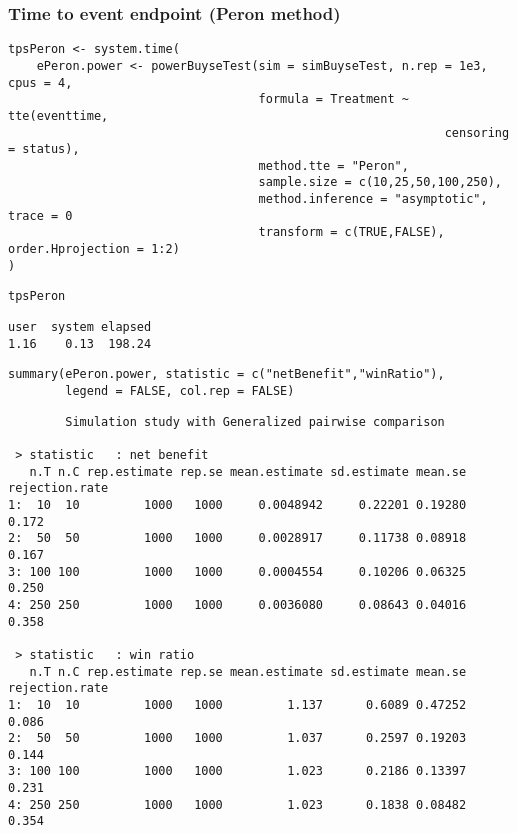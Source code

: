 \documentclass[12pt]{article}
\begin{document}
\clearpage

\subsubsection{Time to event endpoint (Peron method)}
\label{sec:org3f23fac}
\lstset{language=r,label= ,caption= ,captionpos=b,numbers=none}
\begin{lstlisting}
tpsPeron <- system.time(
	ePeron.power <- powerBuyseTest(sim = simBuyseTest, n.rep = 1e3, cpus = 4,
								   formula = Treatment ~ tte(eventtime, 
															 censoring = status), 
								   method.tte = "Peron",
								   sample.size = c(10,25,50,100,250), 
								   method.inference = "asymptotic", trace = 0
								   transform = c(TRUE,FALSE), order.Hprojection = 1:2)
)
\end{lstlisting}

\lstset{language=r,label= ,caption= ,captionpos=b,numbers=none}
\begin{lstlisting}
tpsPeron
\end{lstlisting}

\begin{verbatim}
user  system elapsed 
1.16    0.13  198.24
\end{verbatim}

\lstset{language=r,label= ,caption= ,captionpos=b,numbers=none}
\begin{lstlisting}
summary(ePeron.power, statistic = c("netBenefit","winRatio"), 
		legend = FALSE, col.rep = FALSE)
\end{lstlisting}

\begin{verbatim}
        Simulation study with Generalized pairwise comparison

 > statistic   : net benefit
   n.T n.C rep.estimate rep.se mean.estimate sd.estimate mean.se rejection.rate
1:  10  10         1000   1000     0.0048942     0.22201 0.19280          0.172
2:  50  50         1000   1000     0.0028917     0.11738 0.08918          0.167
3: 100 100         1000   1000     0.0004554     0.10206 0.06325          0.250
4: 250 250         1000   1000     0.0036080     0.08643 0.04016          0.358

 > statistic   : win ratio
   n.T n.C rep.estimate rep.se mean.estimate sd.estimate mean.se rejection.rate
1:  10  10         1000   1000         1.137      0.6089 0.47252          0.086
2:  50  50         1000   1000         1.037      0.2597 0.19203          0.144
3: 100 100         1000   1000         1.023      0.2186 0.13397          0.231
4: 250 250         1000   1000         1.023      0.1838 0.08482          0.354
\end{verbatim}
\end{document}
